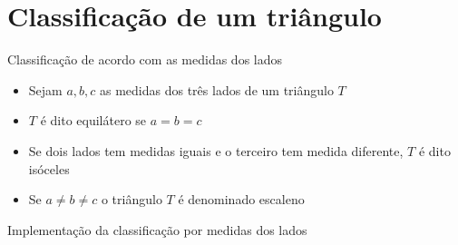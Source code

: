\section{Classificação de um triângulo}

\begin{frame}[fragile]{Classificação de acordo com as medidas dos lados}

    \begin{itemize}
        \item Sejam $a, b, c$ as medidas dos três lados de um triângulo $T$
        \pause

        \item $T$ é dito equilátero se $a = b = c$
        \pause

        \item Se dois lados tem medidas iguais e o terceiro tem medida diferente, $T$ é dito
            isóceles
        \pause

        \item Se $a \neq b\neq c$ o triângulo $T$ é denominado escaleno

    \end{itemize}

\end{frame}

\begin{frame}[fragile]{Implementação da classificação por medidas dos lados}
\end{frame}

